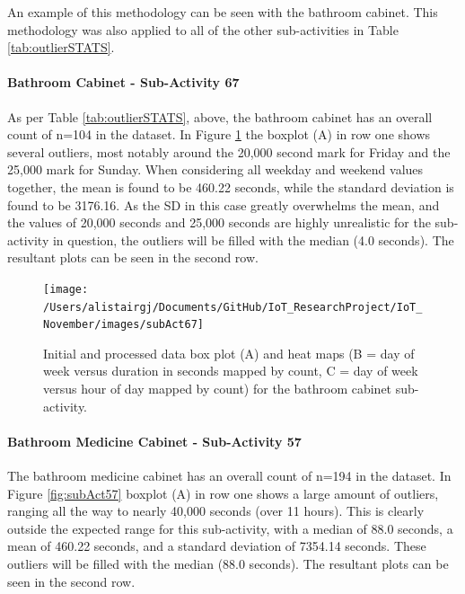 \documentclass[11pt,]{article}
\let\oldparagraph\paragraph
\renewcommand{\paragraph}[1]{\oldparagraph{#1}\mbox{}}
\begin{document}
An example of this methodology can be seen with the bathroom cabinet.
This methodology was also applied to all of the other sub-activities in
Table \ref{tab:outlierSTATS}.

\hypertarget{bathroom-cabinet---sub-activity-67}{%
\paragraph{Bathroom Cabinet - Sub-Activity
67}\label{bathroom-cabinet---sub-activity-67}}

As per Table \ref{tab:outlierSTATS}, above, the bathroom cabinet has an
overall count of n=104 in the dataset. In Figure \ref{fig:subAct67} the
boxplot (A) in row one shows several outliers, most notably around the
20,000 second mark for Friday and the 25,000 mark for Sunday. When
considering all weekday and weekend values together, the mean is found
to be 460.22 seconds, while the standard deviation is found to be
3176.16. As the SD in this case greatly overwhelms the mean, and the
values of 20,000 seconds and 25,000 seconds are highly unrealistic for
the sub-activity in question, the outliers will be filled with the
median (4.0 seconds). The resultant plots can be seen in the second row.

\begin{figure}[H]

{\centering \texttt{[image: /Users/alistairgj/Documents/GitHub/IoT\_ResearchProject/IoT\_November/images/subAct67]} 

}

\caption{Initial and processed data box plot (A) and heat maps (B = day of week versus duration in seconds mapped by count, C = day of week versus hour of day mapped by count) for the bathroom cabinet sub-activity.}\label{fig:subAct67}
\end{figure}

\hypertarget{bathroom-medicine-cabinet---sub-activity-57}{%
\paragraph{Bathroom Medicine Cabinet - Sub-Activity
57}\label{bathroom-medicine-cabinet---sub-activity-57}}

The bathroom medicine cabinet has an overall count of n=194 in the
dataset. In Figure \ref{fig:subAct57} boxplot (A) in row one shows a
large amount of outliers, ranging all the way to nearly 40,000 seconds
(over 11 hours). This is clearly outside the expected range for this
sub-activity, with a median of 88.0 seconds, a mean of 460.22 seconds,
and a standard deviation of 7354.14 seconds. These outliers will be
filled with the median (88.0 seconds). The resultant plots can be seen
in the second row.
\end{document}
